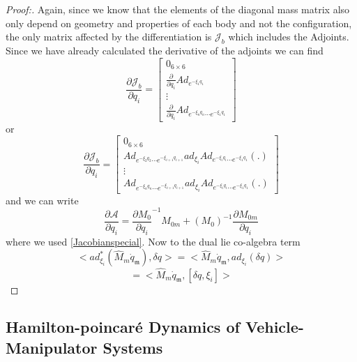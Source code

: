 \documentclass[lettersize,journal]{IEEEtran}
\def \Ad {\textbf{Ad}}
\def \A {\mathcal{A}}
\theoremstyle{remark}
\begin{document}
\begin{proof}[Proof:]
Again, since we know that the elements of the diagonal mass matrix also only depend on geometry and properties of each body and not the configuration, the only matrix affected by the differentiation is $\mathcal{J}_b$ which includes the Adjoints. Since we have already calculated the derivative of the adjoints we can find
\begin{equation}
    \frac{\partial\mathcal{J}_b}{\partial q_i}=\begin{bmatrix}0_{6\times6}\\\frac{\partial}{\partial q_i}{Ad}_{e^{-\xi_1q_1}}\\\vdots\\\frac{\partial}{\partial q_i}{Ad}_{e^{-\xi_nq_n} \cdots e^{-\xi_1q_1}}  \end{bmatrix}
\end{equation}
or
\begin{equation} \frac{\partial\mathcal{J}_b}{\partial q_i}=\begin{bmatrix}0_{6\times6}\\Ad_{e^{-\xi_2q_2}\cdots e^{-\xi_{i+1}q_{i+1}}}ad_{\xi_i}Ad_{e^{-\xi_iq_i}\cdots e^{-\xi_1q_1}}(.)\\\vdots\\Ad_{e^{-\xi_nq_n}\cdots e^{-\xi_{i+1}q_{i+1}}}ad_{\xi_i}Ad_{e^{-\xi_iq_i}\cdots e^{-\xi_1q_1}}(.) \end{bmatrix}
\end{equation}
and we  can write
\begin{equation}
 \frac{\partial \A}{\partial q_i}
=\frac{\partial M_0}{\partial q_i}^{-1}M_{0m}+(M_0)^{-1}\frac{\partial M_{0m}}{\partial q_i}
\label{jspderiv}
\end{equation}
where we used \eqref{Jacobianspecial}. Now to the dual lie co-algebra term
\begin{equation}
    <ad^{*}_{\xi_i}({\hat{M}_{m}}{}\dot{q}_\mathfrak{m}),\delta q>=<{\hat{M}_{m}}{}\dot{q}_\mathfrak{m},ad_{\xi_i}(\delta q)>
\end{equation}
\begin{equation}
    =<{\hat{M}_{m}}{}\dot{q}_\mathfrak{m},[\delta q, \xi_i]>
\end{equation}

\end{proof}

\subsection{Hamilton-poincar\'{e} Dynamics of Vehicle-Manipulator Systems}
\end{document}
